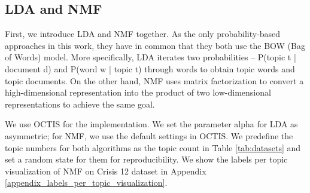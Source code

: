 \documentclass[11pt]{article}
\begin{document}
\subsection{LDA and NMF}
First, we introduce LDA and NMF together. As the only probability-based approaches in this work, they have in common that they both use the BOW (Bag of Words) model. More specifically, LDA iterates two probabilities -- P(topic t | document d) and P(word w | topic t) through words to obtain topic words and topic documents. On the other hand, NMF uses matrix factorization to convert a high-dimensional representation into the product of two low-dimensional representations to achieve the same goal.

We use OCTIS for the implementation. We set the parameter alpha for LDA as asymmetric; for NMF, we use the default settings in OCTIS. We predefine the topic numbers for both algorithms as the topic count in Table \ref{tab:datasets} and set a random state for them for reproducibility. We show the labels per topic visualization of NMF on Crisis 12 dataset in Appendix \ref{appendix_labels_per_topic_visualization}.
\end{document}
